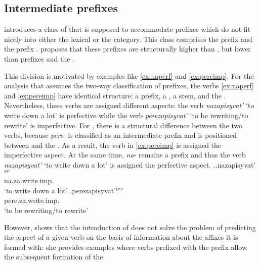 \subsection{Intermediate prefixes}
\cite{Tatevosov:07} introduces a class of  that is supposed to accommodate prefixes which do not fit nicely into either the lexical or the  category. This class comprises the  prefix  and the  prefix . \citet{Tatevosov:07} proposes that these prefixes are structurally higher than , but lower than  prefixes and the . 

This division is motivated by examples like \ref{ex:naperf} and \ref{ex:pereimp}. For the analysis that assumes the two-way classification of prefixes, the verbs \ref{ex:naperf} and \ref{ex:pereimp} have identical  structure: a  prefix, a , a stem, and the . Nevertheless, these verbs are assigned different aspects: the verb \textit{nazapisyvat'} `to write down a lot' is perfective while the verb \textit{perezapisyvat'} `to be rewriting/to rewrite' is imperfective. For \citet{Tatevosov:07}, there is a structural difference between the two verbs, because \textit{pere}- is classified as an intermediate prefix and is positioned between  and the . As a result, the verb in \ref{ex:pereimp} is assigned the imperfective aspect. At the same time, \textit{na}- remains a  prefix and thus the verb \textit{nazapisyvat'} `to write down a lot' is assigned the perfective aspect.
\ex.\ag.\label{ex:naperf}nazapisyvat'$^{\textsc{pf}}$\\
na.za.write.imp.\\
`to write down a lot'
\bg.\label{ex:pereimp}perezapisyvat'$^{\textsc{ipf}}$\\
pere.za.write.imp.\\
`to be rewriting/to rewrite'

However, \cite{Kagan:book} shows that the introduction of  does not solve the problem of predicting the aspect of a given verb on the basis of information about the affixes it is formed with: she provides examples where verbs prefixed with the  prefix  allow the subsequent formation of the  \citep[35, ex.~\ref{ex:pod} here]{Kagan:book}

